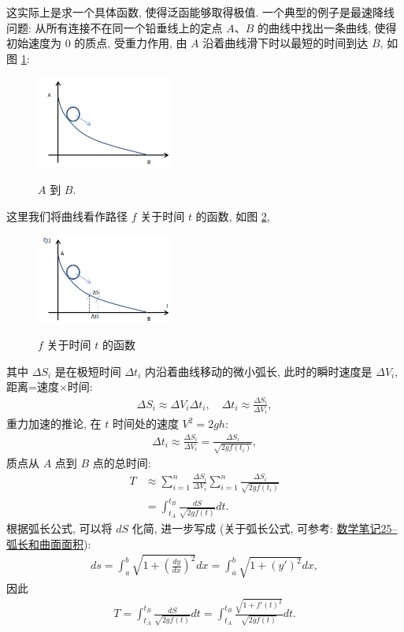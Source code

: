 \documentclass[cn,hazy,blue,14pt,screen]{./cls/elegantnote}
\begin{document}
这实际上是求一个具体函数, 使得泛函能够取得极值. 一个典型的例子是最速降线问题: 从所有连接不在同一个铅垂线上的定点 $ A $、$ B $ 的曲线中找出一条曲线, 使得初始速度为 $ 0 $ 的质点, 受重力作用, 由 $ A $ 沿着曲线滑下时以最短的时间到达 $ B $, 如图 \ref{fig1}:
\begin{figure}[!htbp]
	\centering
	\caption{$ A $ 到 $ B $.}
	\includegraphics[width=0.4\textwidth]{./figures/1.png}
	\label{fig1}
\end{figure}

这里我们将曲线看作路径 $ f $ 关于时间 $ t $ 的函数, 如图 \ref{fig2}, 
\begin{figure}[!htbp]
	\centering
	\caption{$ f $ 关于时间 $ t $ 的函数}
	\includegraphics[width=0.4\textwidth]{./figures/2.png}
	\label{fig2}
\end{figure}

其中 $ \Delta S_i $ 是在极短时间 $ \Delta t_i $ 内沿着曲线移动的微小弧长, 此时的瞬时速度是 $ \Delta V_i $, 距离=速度$ \times $时间:
\begin{align*}
	\Delta S_i \approx \Delta V_i \Delta t_i, \quad \Delta t_i \approx \frac{\Delta S_i}{\Delta V_i},
\end{align*}
重力加速的推论, 在 $ t $ 时间处的速度 $ V^2 = 2gh $:
\begin{align*}
 	\Delta t_i \approx \frac{\Delta S_i}{\Delta V_i} = \frac{\Delta S_i}{\sqrt{2gf(t_i)}},
\end{align*}
质点从 $ A $ 点到 $ B $ 点的总时间:
\begin{align*}
 	T&\approx \sum_{i=1}^{n}\frac{\Delta S_i}{\Delta V_i}\sum_{i=1}^{n}\frac{\Delta S_i}{\sqrt{2gf(t_i)}} \\
 	&= \int_{t_A}^{t_B}\frac{dS}{\sqrt{2gf(t)}} dt.
\end{align*}
根据弧长公式, 可以将 $ dS $ 化简, 进一步写成 (关于弧长公式, 可参考: \href{https://www.cnblogs.com/bigmonkey/p/7908854.html}{数学笔记25--弧长和曲面面积}): 
\begin{align*}
 	ds = \int_a^b\sqrt{1+(\frac{dy}{dx})^2} dx = \int_a^b\sqrt{1+(y')^2}dx,
\end{align*}
因此
\begin{align*}
 	T = \int_{t_A}^{t_B}\frac{dS}{\sqrt{2gf(t)}} dt = \int_{t_A}^{t_B}\frac{\sqrt{1+f'(t)^2}}{\sqrt{2gf(t)}} dt.
\end{align*}
\end{document}
